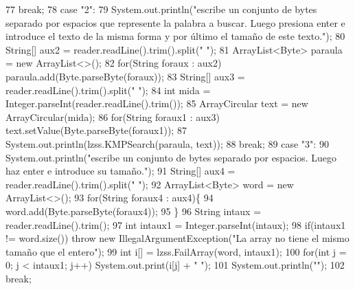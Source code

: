 \begin{DoxyCode}
77                 \textcolor{keywordflow}{break};
78                 \textcolor{keywordflow}{case} \textcolor{stringliteral}{"2"}:
79                     System.out.println(\textcolor{stringliteral}{"escribe un conjunto de bytes separado por espacios que represente
       la palabra a buscar. Luego presiona enter e introduce el texto de la misma forma y por último el tamaño de
       este texto."});
80                     String[] aux2 = reader.readLine().trim().split(\textcolor{stringliteral}{" "});
81                     ArrayList<Byte> paraula = \textcolor{keyword}{new} ArrayList<>();
82                     \textcolor{keywordflow}{for}(String foraux : aux2) paraula.add(Byte.parseByte(foraux));
83                     String[] aux3 = reader.readLine().trim().split(\textcolor{stringliteral}{" "});
84                     \textcolor{keywordtype}{int} mida = Integer.parseInt(reader.readLine().trim());
85                     ArrayCircular text = \textcolor{keyword}{new} ArrayCircular(mida);
86                     \textcolor{keywordflow}{for}(String foraux1 : aux3) text.setValue(Byte.parseByte(foraux1));
87                     System.out.println(lzss.KMPSearch(paraula, text));
88                 \textcolor{keywordflow}{break};
89                 \textcolor{keywordflow}{case} \textcolor{stringliteral}{"3"}:
90                     System.out.println(\textcolor{stringliteral}{"escribe un conjunto de bytes separado por espacios. Luego haz enter
       e introduce su tamaño."});
91                     String[] aux4 = reader.readLine().trim().split(\textcolor{stringliteral}{" "});
92                     ArrayList<Byte> word = \textcolor{keyword}{new} ArrayList<>();
93                     \textcolor{keywordflow}{for}(String foraux4 : aux4)\{
94                         word.add(Byte.parseByte(foraux4));
95                     \}
96                     String intaux = reader.readLine().trim();
97                     \textcolor{keywordtype}{int} intaux1 = Integer.parseInt(intaux);
98                     \textcolor{keywordflow}{if}(intaux1 != word.size()) \textcolor{keywordflow}{throw} \textcolor{keyword}{new} IllegalArgumentException(\textcolor{stringliteral}{"La array no tiene el
       mismo tamaño que el entero"});
99                     \textcolor{keywordtype}{int} i[] = lzss.FailArray(word, intaux1);
100                     \textcolor{keywordflow}{for}(\textcolor{keywordtype}{int} j = 0; j < intaux1; j++) System.out.print(i[j] + \textcolor{stringliteral}{" "});
101                     System.out.println(\textcolor{stringliteral}{""});
102                 \textcolor{keywordflow}{break};

\end{DoxyCode}
